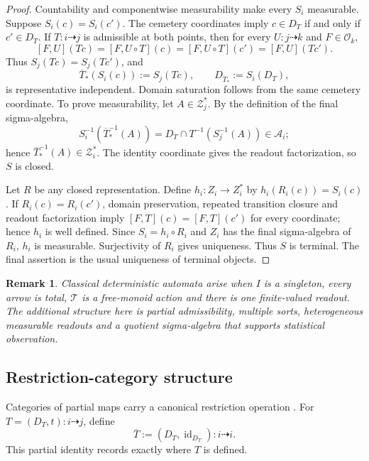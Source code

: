 \documentclass[11pt]{article}
\newtheorem{remark}[definition]{Remark}
\begin{document}
{\begin{proof}
Countability and componentwise measurability make every $S_i$ measurable. Suppose $S_i(c)=S_i(c')$. The cemetery coordinates imply $c\in D_T$ if and only if $c'\in D_T$. If $T:i\dashrightarrow j$ is admissible at both points, then for every $U:j\dashrightarrow k$ and $F\in\mathcal O_k$,
\[
 [F,U](Tc)=[F,U\circ T](c)=[F,U\circ T](c')=[F,U](Tc').
\]
Thus $S_j(Tc)=S_j(Tc')$, and
\[
 \overline T_*(S_i(c)):=S_j(Tc),
 \qquad D_{\overline T_*}:=S_i(D_T),
\]
is representative independent. Domain saturation follows from the same cemetery coordinate. To prove measurability, let $A\in\mathcal Z_j^*$. By the definition of the final sigma-algebra,
\[
 S_i^{-1}\!\left(\overline T_*^{-1}(A)\right)
 =D_T\cap T^{-1}(S_j^{-1}(A))\in\mathcal A_i;
\]
hence $\overline T_*^{-1}(A)\in\mathcal Z_i^*$. The identity coordinate gives the readout factorization, so $S$ is closed.

Let $R$ be any closed representation. Define $h_i:Z_i\to Z_i^*$ by $h_i(R_i(c))=S_i(c)$. If $R_i(c)=R_i(c')$, domain preservation, repeated transition closure and readout factorization imply $[F,T](c)=[F,T](c')$ for every coordinate; hence $h_i$ is well defined. Since $S_i=h_i\circ R_i$ and $Z_i$ has the final sigma-algebra of $R_i$, $h_i$ is measurable. Surjectivity of $R_i$ gives uniqueness. Thus $S$ is terminal. The final assertion is the usual uniqueness of terminal objects.
\end{proof}

\begin{remark}
Classical deterministic automata arise when $I$ is a singleton, every arrow is total, $\mathcal T$ is a free-monoid action and there is one finite-valued readout. The additional structure here is partial admissibility, multiple sorts, heterogeneous measurable readouts and a quotient sigma-algebra that supports statistical observation.
\end{remark}

\subsection{Restriction-category structure}

Categories of partial maps carry a canonical restriction operation \cite{cockettlack2002}. For $T=(D_T,t):i\dashrightarrow j$, define
\[
 \overline T:=(D_T,\operatorname{id}_{D_T}):i\dashrightarrow i.
\]
This partial identity records exactly where $T$ is defined.

}
\end{document}
